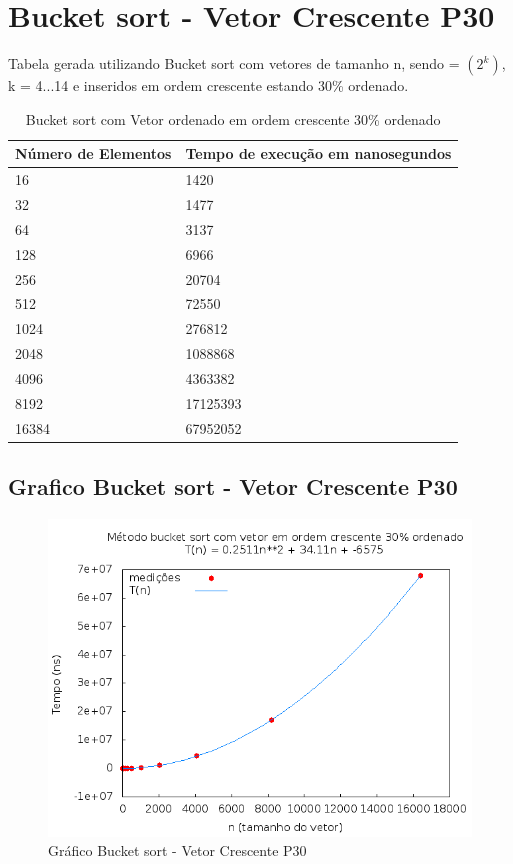 \documentclass[12pt,a4paper,twoside]{report}
\begin{document}
\section{Bucket sort - Vetor Crescente P30}
Tabela gerada utilizando Bucket sort com vetores de tamanho n, sendo = $(2^k)$, k = 4...14 e inseridos em ordem crescente estando 30\% ordenado.

\begin{table}[H]
\centering
\caption{Bucket sort com Vetor ordenado em ordem crescente 30\% ordenado}
\label{my-label}
\begin{tabular}{|l|l|}
\hline
\multicolumn{1}{|c|}{\textbf{Número de Elementos}} & \multicolumn{1}{c|}{\textbf{Tempo de execução em nanosegundos}} \\ \hline
16 & 1420 \\ \hline
32 & 1477 \\ \hline
64 & 3137 \\ \hline
128 & 6966 \\ \hline
256 & 20704 \\ \hline
512 & 72550 \\ \hline
1024 & 276812 \\ \hline
2048 & 1088868 \\ \hline
4096 & 4363382 \\ \hline
8192 & 17125393 \\ \hline
16384 & 67952052 \\ \hline
\end{tabular}
\end{table}

\subsection{Grafico Bucket sort - Vetor Crescente P30}
\begin{figure}[H]
    \centering
    \includegraphics[width=0.7\linewidth]{graficos/Bucket/vIntCrescenteP30/vIntCrescenteP30.png}
  \caption{Gráfico Bucket sort - Vetor Crescente P30}
\end{figure}
\end{document}
